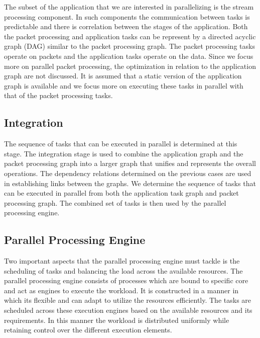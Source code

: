 \documentclass[conference]{IEEEtran}
\newcommand{\comment}[1]{}
\begin{document}
\comment{Application task graph represents the operations associated in performing the computations.} The subset of the application that we are interested in parallelizing is the stream processing component. In such components the communication between tasks is predictable and there is correlation between the stages of the application. Both the packet processing and application tasks can be represent by a directed acyclic graph (DAG) similar to the packet processing graph. The packet processing tasks operate on packets and the application tasks operate on the data. Since we focus more on parallel packet processing, the optimization in relation to the application graph are not discussed. It is assumed that a static version of the application graph is available and we focus more on executing these tasks in parallel with that of the packet processing tasks. 

\subsection{Integration}

The sequence of tasks that can be executed in parallel is determined at this stage. The integration stage is used to combine the application graph and the packet processing graph into a larger graph that unifies and represents the overall operations. The dependency relations determined on the previous cases are used in establishing links between the graphs. We determine the sequence of tasks that can be executed in parallel from both the application task graph and packet processing graph. The combined set of tasks is then used by the parallel processing engine. 

\subsection{Parallel Processing Engine}

Two important aspects that the parallel processing engine must tackle is the scheduling of tasks and balancing the load across the available resources. The parallel processing engine consists of processes which are bound to specific core and act as engines to execute the workload. It is constructed in a manner in which its flexible and can adapt to utilize the resources efficiently. The tasks are scheduled across these execution engines based on the available resources and its requirements. In this manner the workload is distributed uniformly while retaining control over the different execution elements. 
\end{document}
